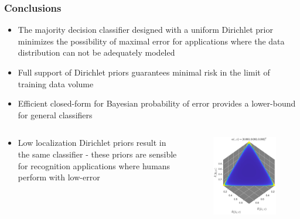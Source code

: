 \documentclass[aspectratio=169]{beamer}
\begin{document}
\begin{frame}
\frametitle{Conclusions}

\begin{itemize}
\item The majority decision classifier designed with a uniform Dirichlet prior minimizes the possibility of maximal error for applications where the data distribution can not be adequately modeled
\item Full support of Dirichlet priors guarantees minimal risk in the limit of training data volume
\item Efficient closed-form for Bayesian probability of error provides a lower-bound for general classifiers
\end{itemize}

\begin{columns}[T]

\begin{column}{.55\linewidth}

\begin{itemize}
\item Low localization Dirichlet priors result in the same classifier - these priors are sensible for recognition applications where humans perform with low-error
\end{itemize}

\end{column}

\begin{column}{.4\linewidth}

\vspace{-2em}
\begin{figure}
\centering
\includegraphics[width=0.5\linewidth]{P_theta_highVar.pdf}
\label{fig:P_theta_highVar}
\end{figure}

\end{column}

\end{columns}


\end{frame}
\end{document}
